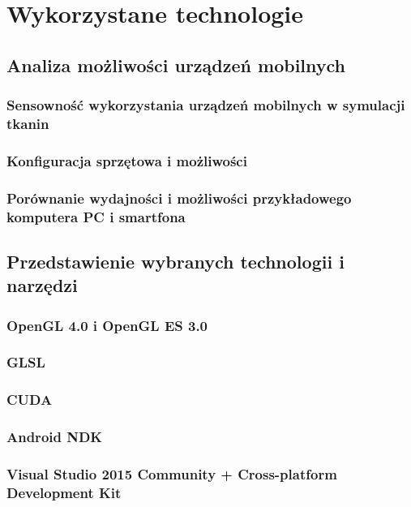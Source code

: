\chapter{Wykorzystane technologie}
\label{t:technologie}


	\section{Analiza możliwości urządzeń mobilnych}
	\label{t:technologie:mobilne}
	
		\subsection{Sensowność wykorzystania urządzeń mobilnych w symulacji tkanin}
		\label{t:technologie:mobilne:dlaczego}
	
		\subsection{Konfiguracja sprzętowa i możliwości}
		\label{t:technologie:mobilne:konfiguracja}
		
		\subsection{Porównanie wydajności i możliwości przykładowego komputera PC i smartfona}
		\label{t:technologie:mobilne:porownanie}

	
	\section{Przedstawienie wybranych technologii i narzędzi}
	\label{t:technologie:narzedzia}
	
		\subsection{OpenGL 4.0 i OpenGL ES 3.0}
		\label{t:technologie:narzedzia:ogl}
		
		\subsection{GLSL}
		\label{t:technologie:narzedzia:glsl}
		
		\subsection{CUDA}
		\label{t:technologie:narzedzia:cuda}
		
		\subsection{Android NDK}
		\label{t:technologie:narzedzia:ndk}
		
		\subsection{Visual Studio 2015 Community + Cross-platform Development Kit}
		\label{t:technologie:narzedzia:vs}